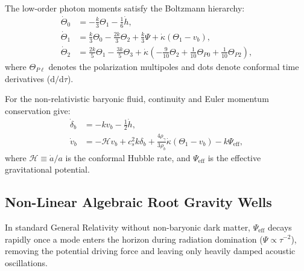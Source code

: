 \documentclass[aps,prd,reprint,superscriptaddress,nofootinbib,twocolumn]{revtex4-2}
\begin{document}
The low-order photon moments satisfy the Boltzmann hierarchy:
\begin{align}
\label{eq:boltzmann_0}
\dot{\Theta}_0 &= -\frac{k}{3} \Theta_1 - \frac{1}{6} \dot{h}, \\
\label{eq:boltzmann_1}
\dot{\Theta}_1 &= \frac{k}{3} \Theta_0 - \frac{2k}{3} \Theta_2 + \frac{k}{3} \Psi + \dot{\kappa} (\Theta_1 - v_b), \\
\label{eq:boltzmann_2}
\dot{\Theta}_2 &= \frac{2k}{5} \Theta_1 - \frac{3k}{5} \Theta_3 + \dot{\kappa} \left( -\frac{9}{10} \Theta_2 + \frac{1}{10} \Theta_{P0} + \frac{1}{10} \Theta_{P2} \right),
\end{align}
where $\Theta_{P\ell}$ denotes the polarization multipoles and dots denote conformal time derivatives ($\mathrm{d}/\mathrm{d}\tau$).

For the non-relativistic baryonic fluid, continuity and Euler momentum conservation give:
\begin{align}
\label{eq:baryon_continuity}
\dot{\delta}_b &= -k v_b - \frac{1}{2} \dot{h}, \\
\label{eq:baryon_euler}
\dot{v}_b &= -\mathcal{H} v_b + c_s^2 k \delta_b + \frac{4\rho_\gamma}{3\rho_b} \dot{\kappa} (\Theta_1 - v_b) - k \Psi_{\text{eff}},
\end{align}
where $\mathcal{H} \equiv \dot{a}/a$ is the conformal Hubble rate, and $\Psi_{\text{eff}}$ is the effective gravitational potential.

\subsection{Non-Linear Algebraic Root Gravity Wells}

In standard General Relativity without non-baryonic dark matter, $\Psi_{\text{eff}}$ decays rapidly once a mode enters the horizon during radiation domination ($\Psi \propto \tau^{-2}$), removing the potential driving force and leaving only heavily damped acoustic oscillations.
\end{document}
